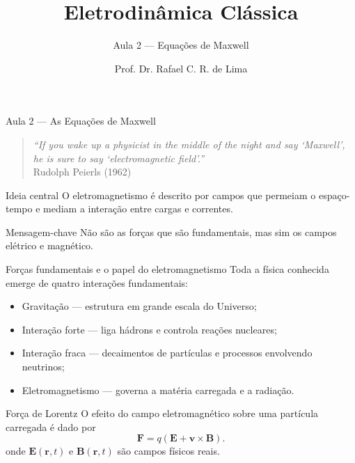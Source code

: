 \documentclass[aspectratio=169]{beamer}
\title[Eletrodinâmica Clássica]{Eletrodinâmica Clássica}
\subtitle{Aula 2 — Equações de Maxwell}
\author{Prof. Dr. Rafael C. R. de Lima}
\institute{UDESC — CCT}
\date{}
\newcommand{\blue}[1]{\textcolor{myblue}{#1}}
\newcommand{\red}[1]{\textcolor{myred}{#1}}
\begin{document}
\begin{frame}
  \titlepage
\end{frame}

\begin{frame}{Aula 2 — As Equações de Maxwell}
\begin{quote}
\emph{``If you wake up a physicist in the middle of the night and say `Maxwell', he is sure to say `electromagnetic field'.''}\\
\hfill Rudolph Peierls (1962)
\end{quote}

\begin{block}{Ideia central}
O eletromagnetismo é descrito por \blue{campos} que permeiam o espaço-tempo e mediam a interação entre cargas e correntes.
\end{block}

\begin{alertblock}{Mensagem-chave}
Não são as forças que são fundamentais, mas sim os \red{campos} elétrico e magnético.
\end{alertblock}
\end{frame}

\begin{frame}{Forças fundamentais e o papel do eletromagnetismo}
Toda a física conhecida emerge de \blue{quatro interações fundamentais}:
\begin{itemize}
  \item Gravitação — estrutura em grande escala do Universo;
  \item Interação forte — liga hádrons e controla reações nucleares;
  \item Interação fraca — decaimentos de partículas e processos envolvendo neutrinos;
  \item \red{Eletromagnetismo} — governa a matéria carregada e a radiação.
\end{itemize}

\begin{block}{Força de Lorentz}
O efeito do campo eletromagnético sobre uma partícula carregada é dado por
\begin{equation}
\bm F = q\left(\bm E + \bm v \times \bm B\right).
\tag{2.1}
\label{eq:lorentz}
\end{equation}
onde $\bm E(\bm r,t)$ e $\bm B(\bm r,t)$ são campos físicos reais.
\end{block}
\end{frame}
\end{document}
